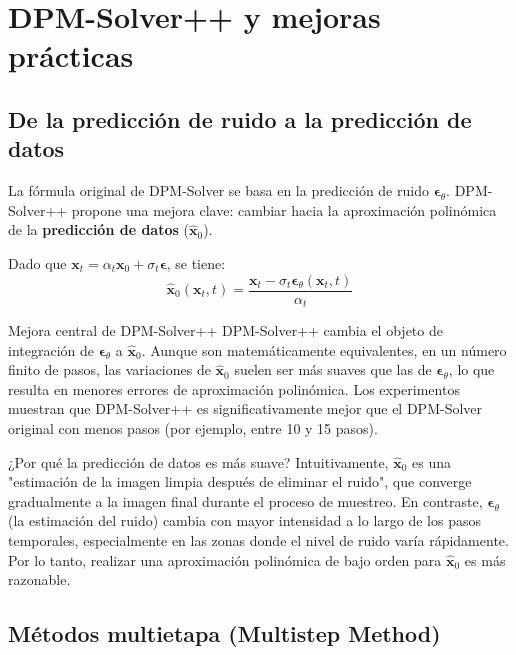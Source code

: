 \section{DPM-Solver++ y mejoras prácticas}

\subsection{De la predicción de ruido a la predicción de datos}

La fórmula original de DPM-Solver se basa en la predicción de ruido $\boldsymbol{\epsilon}_\theta$. DPM-Solver++ propone una mejora clave: cambiar hacia la aproximación polinómica de la \textbf{predicción de datos} ($\hat{\mathbf{x}}_0$).

Dado que $\mathbf{x}_t = \alpha_t \mathbf{x}_0 + \sigma_t \boldsymbol{\epsilon}$, se tiene:
$$\hat{\mathbf{x}}_0(\mathbf{x}_t, t) = \frac{\mathbf{x}_t - \sigma_t \boldsymbol{\epsilon}_\theta(\mathbf{x}_t, t)}{\alpha_t}$$

\begin{importantbox}{Mejora central de DPM-Solver++}
DPM-Solver++ cambia el objeto de integración de $\boldsymbol{\epsilon}_\theta$ a $\hat{\mathbf{x}}_0$. Aunque son matemáticamente equivalentes, en un número finito de pasos, las variaciones de $\hat{\mathbf{x}}_0$ suelen ser más suaves que las de $\boldsymbol{\epsilon}_\theta$, lo que resulta en menores errores de aproximación polinómica. Los experimentos muestran que DPM-Solver++ es significativamente mejor que el DPM-Solver original con menos pasos (por ejemplo, entre 10 y 15 pasos).
\end{importantbox}

\begin{knowledgebox}{¿Por qué la predicción de datos es más suave?}
Intuitivamente, $\hat{\mathbf{x}}_0$ es una "estimación de la imagen limpia después de eliminar el ruido", que converge gradualmente a la imagen final durante el proceso de muestreo. En contraste, $\boldsymbol{\epsilon}_\theta$ (la estimación del ruido) cambia con mayor intensidad a lo largo de los pasos temporales, especialmente en las zonas donde el nivel de ruido varía rápidamente. Por lo tanto, realizar una aproximación polinómica de bajo orden para $\hat{\mathbf{x}}_0$ es más razonable.
\end{knowledgebox}

\subsection{Métodos multietapa (Multistep Method)}

